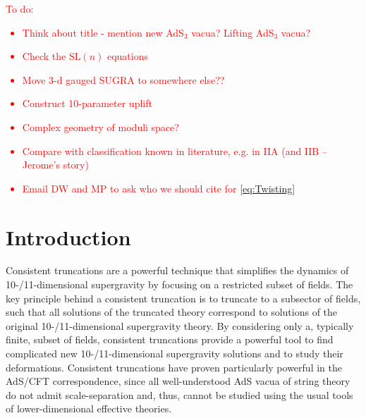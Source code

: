 \documentclass[a4paper, 11pt]{article}
\numberwithin{equation}{section}
\newcommand{\SL}[1]{\mathrm{SL}( #1 )}
\newcommand{\+}{\oplus}
\newcommand{\EM}[1]{\textcolor{red}{#1}}
\begin{document}
\tableofcontents
	
\newpage

\EM{To do:
\begin{itemize}
	\item Think about title - mention new AdS$_3$ vacua? Lifting AdS$_3$ vacua?
	\item Check the $\SL{n}$ equations
	\item Move 3-d gauged SUGRA to somewhere else??
	\item Construct 10-parameter uplift
	\item Complex geometry of moduli space?
	\item Compare with classification known in literature, e.g. in IIA (and IIB -- Jerome's story)
	\item Email DW and MP to ask who we should cite for \eqref{eq:Twisting}
\end{itemize}
}

\section{Introduction}
Consistent truncations are a powerful technique that simplifies the dynamics of 10-/11-dimensional supergravity by focusing on a restricted subset of fields. The key principle behind a consistent truncation is to truncate to a subsector of fields, such that all solutions of the truncated theory correspond to solutions of the original 10-/11-dimensional supergravity theory. By considering only a, typically finite, subset of fields, consistent truncations provide a powerful tool to find complicated new 10-/11-dimensional supergravity solutions and to study their deformations. Consistent truncations have proven particularly powerful in the AdS/CFT correspondence, since all well-understood AdS vacua of string theory do not admit scale-separation and, thus, cannot be studied using the usual tools of lower-dimensional effective theories.
\end{document}
